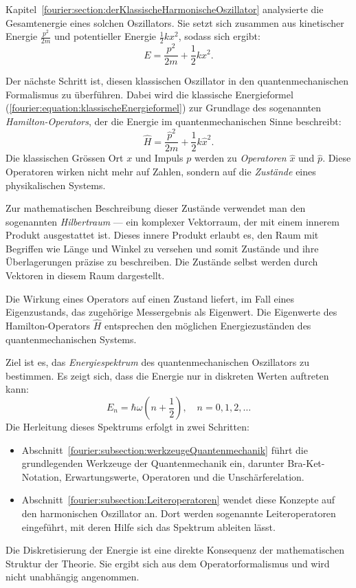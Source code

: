 	Kapitel~\ref{fourier:section:derKlassischeHarmonischeOszillator} analysierte die Gesamtenergie eines solchen Oszillators.
	Sie setzt sich zusammen aus kinetischer Energie $\frac{p^2}{2m}$ und potentieller Energie $\frac{1}{2}kx^2$, sodass sich ergibt:
	\begin{equation}\label{fourier:equation:klassischeEnergieformel}
	E = \frac{p^2}{2m} + \frac{1}{2}kx^2.
	\end{equation}

	Der nächste Schritt ist, diesen klassischen Oszillator in den quantenmechanischen Formalismus zu überführen.
	Dabei wird die klassische Energieformel (\ref{fourier:equation:klassischeEnergieformel}) zur Grundlage des sogenannten \emph{Hamilton-Operators}, der die Energie im quantenmechanischen Sinne beschreibt:
	\begin{equation}
	\hat{H} = \frac{\hat{p}^2}{2m} + \frac{1}{2} k \hat{x}^2.
	\label{fourier:equation:hamiltonOperator}
	\end{equation}
	Die klassischen Grössen Ort $x$ und Impuls $p$ werden zu \emph{Operatoren} $\hat{x}$ und $\hat{p}$.
	Diese Operatoren wirken nicht mehr auf Zahlen, sondern auf die \emph{Zustände} eines physikalischen Systems.
	
	Zur mathematischen Beschreibung dieser Zustände verwendet man den sogenannten \emph{Hilbertraum} --- ein komplexer Vektorraum, der mit einem innerem Produkt ausgestattet ist.
	Dieses innere Produkt erlaubt es, den Raum mit Begriffen wie Länge und Winkel zu versehen und somit Zustände und ihre Überlagerungen präzise zu beschreiben.
	Die Zustände selbst werden durch Vektoren in diesem Raum dargestellt.

	Die Wirkung eines Operators auf einen Zustand liefert, im Fall eines Eigenzustands, das zugehörige Messergebnis als Eigenwert.
	Die Eigenwerte des Hamilton-Operators $\hat{H}$ entsprechen den möglichen Energiezuständen des quantenmechanischen Systems.

	Ziel ist es, das \emph{Energiespektrum} des quantenmechanischen Oszillators zu bestimmen.
	Es zeigt sich, dass die Energie nur in diskreten Werten auftreten kann:
	\[
	E_n = \hbar \omega \left(n + \frac{1}{2} \right), \quad n = 0, 1, 2, \dots
	\]
	Die Herleitung dieses Spektrums erfolgt in zwei Schritten:
	\begin{itemize}
		\item Abschnitt~\ref{fourier:subsection:werkzeugeQuantenmechanik} führt die grundlegenden Werkzeuge der Quantenmechanik ein,
		darunter Bra-Ket-Notation, Erwartungswerte, Operatoren und die Unschärferelation.
		\item Abschnitt~\ref{fourier:subsection:Leiteroperatoren} wendet diese Konzepte auf den harmonischen Oszillator an.
		Dort werden sogenannte Leiteroperatoren eingeführt, mit deren Hilfe sich das Spektrum ableiten lässt.
	\end{itemize}
	Die Diskretisierung der Energie ist eine direkte Konsequenz der mathematischen Struktur der Theorie.
	Sie ergibt sich aus dem Operatorformalismus und wird nicht unabhängig angenommen.


